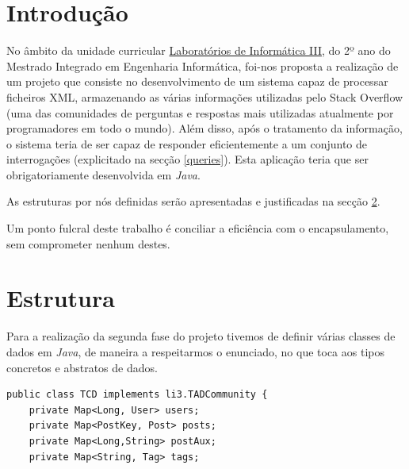 \documentclass[a4paper, 11pt, oneside]{article}
\begin{document}

\tableofcontents

\newpage


\section{Introdução}

No âmbito da unidade curricular \underline{Laboratórios de Informática III}, do 2º ano do Mestrado Integrado em Engenharia Informática, foi-nos proposta a realização de 
um projeto que consiste no desenvolvimento de um sistema capaz de processar ficheiros XML, armazenando as várias informações utilizadas pelo Stack Overflow (uma das 
comunidades de perguntas e respostas mais utilizadas atualmente por programadores em todo o mundo). Além disso, após o tratamento da informação, o sistema teria de ser capaz 
de responder eficientemente a um conjunto de interrogações (explicitado na secção \ref{queries}). Esta aplicação teria que ser obrigatoriamente desenvolvida em \textit{Java}.

As estruturas por nós definidas serão apresentadas e justificadas na secção \ref{structs}.

Um ponto fulcral deste trabalho é conciliar a eficiência com o encapsulamento, sem comprometer nenhum destes.





\newpage
\section{Estrutura}
\label{structs}

Para a realização da segunda fase do projeto tivemos de definir várias classes de dados em \textit{Java}, de maneira a respeitarmos o enunciado, no que toca aos tipos 
concretos e abstratos de dados.



\begin{lstlisting}
public class TCD implements li3.TADCommunity {
    private Map<Long, User> users;
    private Map<PostKey, Post> posts;
    private Map<Long,String> postAux;
    private Map<String, Tag> tags;
\end{lstlisting}
\end{document}
